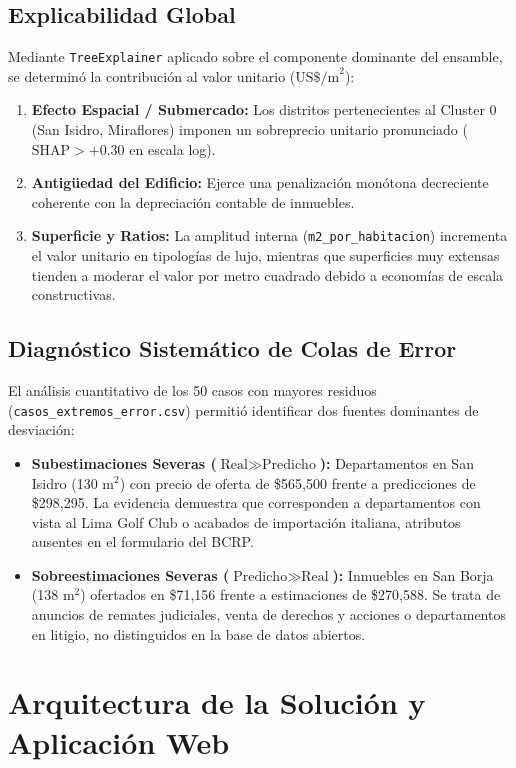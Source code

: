 \documentclass[11pt,a4paper]{article}
\begin{document}
\subsection{Explicabilidad Global}
Mediante \texttt{TreeExplainer} aplicado sobre el componente dominante del ensamble, se determinó la contribución al valor unitario ($\text{US\$/m}^2$):
\begin{enumerate}
    \item \textbf{Efecto Espacial / Submercado:} Los distritos pertenecientes al Cluster 0 (San Isidro, Miraflores) imponen un sobreprecio unitario pronunciado ($\text{SHAP} > +0.30$ en escala log).
    \item \textbf{Antigüedad del Edificio:} Ejerce una penalización monótona decreciente coherente con la depreciación contable de inmuebles.
    \item \textbf{Superficie y Ratios:} La amplitud interna (\texttt{m2\_por\_habitacion}) incrementa el valor unitario en tipologías de lujo, mientras que superficies muy extensas tienden a moderar el valor por metro cuadrado debido a economías de escala constructivas.
\end{enumerate}

\subsection{Diagnóstico Sistemático de Colas de Error}
El análisis cuantitativo de los 50 casos con mayores residuos (\texttt{casos\_extremos\_error.csv}) permitió identificar dos fuentes dominantes de desviación:
\begin{itemize}
    \item \textbf{Subestimaciones Severas ($\text{Real} \gg \text{Predicho}$):} Departamentos en San Isidro (130 $\text{m}^2$) con precio de oferta de \$565,500 frente a predicciones de \$298,295. La evidencia demuestra que corresponden a departamentos con vista al Lima Golf Club o acabados de importación italiana, atributos ausentes en el formulario del BCRP.
    \item \textbf{Sobreestimaciones Severas ($\text{Predicho} \gg \text{Real}$):} Inmuebles en San Borja (138 $\text{m}^2$) ofertados en \$71,156 frente a estimaciones de \$270,588. Se trata de anuncios de remates judiciales, venta de derechos y acciones o departamentos en litigio, no distinguidos en la base de datos abiertos.
\end{itemize}

\section{Arquitectura de la Solución y Aplicación Web}
\end{document}
